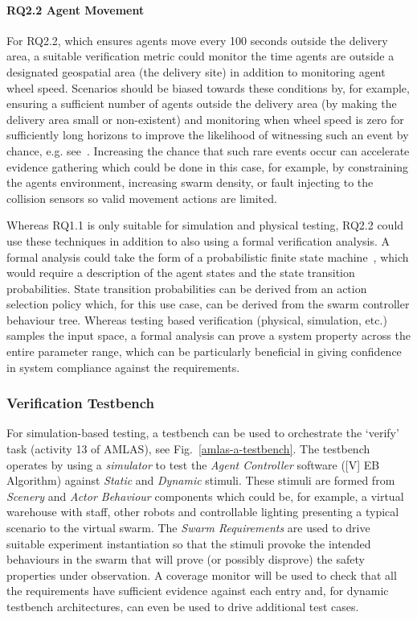 \documentclass[lettersize,journal]{IEEEtran}
\begin{document}
\paragraph*{RQ2.2 Agent Movement}

For RQ2.2, which ensures agents move every 100 seconds outside the delivery area, a suitable verification metric could monitor the time agents are outside a designated geospatial area (the delivery site) in addition to monitoring agent wheel speed. Scenarios should be biased towards these conditions by, for example, ensuring a sufficient number of agents outside the delivery area (by making the delivery area small or non-existent) and monitoring when wheel speed is zero for sufficiently long horizons to improve the likelihood of witnessing such an event by chance, e.g. see~\cite{chance2020agency}. Increasing the chance that such rare events occur can accelerate evidence gathering which could be done in this case, for example, by constraining the agents environment, increasing swarm density, or fault injecting to the collision sensors so valid movement actions are limited. 

Whereas RQ1.1 is only suitable for simulation and physical testing, RQ2.2 could use these techniques in addition to also using a formal verification analysis. A formal analysis could take the form of a probabilistic finite state machine~\cite{Calinescu2018}, which would require a description of the agent states and the state transition probabilities. State transition probabilities can be derived from an action selection policy which, for this use case, can be derived from the swarm controller behaviour tree. Whereas testing based verification (physical, simulation, etc.) samples the input space, a formal analysis can prove a system property across the entire parameter range, which can be particularly beneficial in giving confidence in system compliance against the requirements. 
\\

\subsubsection*{Verification Testbench}

For simulation-based testing, a testbench can be used to orchestrate the `verify' task (activity 13 of AMLAS), see Fig.~\ref{amlas-a-testbench}. The testbench operates by using a \emph{simulator} to test the \emph{Agent Controller} software ([V] EB Algorithm) against \emph{Static} and \emph{Dynamic} stimuli. These stimuli are formed from \emph{Scenery} and \emph{Actor Behaviour} components which could be, for example, a virtual warehouse with staff, other robots and controllable lighting presenting a typical scenario to the virtual swarm. The \emph{Swarm Requirements} are used to drive suitable experiment instantiation so that the stimuli provoke the intended behaviours in the swarm that will prove (or possibly disprove) the safety properties under observation. A coverage monitor will be used to check that all the requirements have sufficient evidence against each entry and, for dynamic testbench architectures, can even be used to drive additional test cases. 
\end{document}
